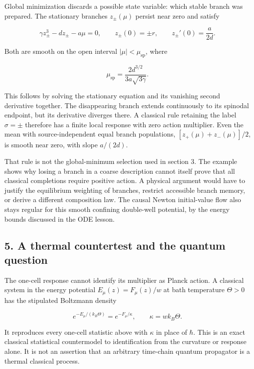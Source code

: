 \documentclass[11pt,a4paper]{article}
\begin{document}
Global minimization discards a possible state variable: which stable
branch was prepared. The stationary branches \(z_\pm(\mu)\) persist near
zero and satisfy

\[
 \gamma z_\pm^3-dz_\pm-a\mu=0,\qquad
 z_\pm(0)=\pm r,\qquad z_\pm'(0)=\frac a{2d}.
 \tag{13}
\]

Both are smooth on the open interval \(|\mu|<\mu_{\mathrm{sp}}\), where

\[\mu_{\mathrm{sp}}=
 \frac{2d^{3/2}}{3a\sqrt{3\gamma}}.\tag{14}\]

This follows by solving the stationary equation and its vanishing second
derivative together. The disappearing branch extends continuously to its
spinodal endpoint, but its derivative diverges there. A classical rule
retaining the label \(\sigma=\pm\) therefore has a finite local response
with zero action multiplier. Even the mean with source-independent equal
branch populations, \([z_+(\mu)+z_-(\mu)]/2\), is smooth near zero, with
slope \(a/(2d)\).

That rule is not the global-minimum selection used in section 3. The
example shows why losing a branch in a coarse description cannot itself
prove that all classical completions require positive action. A physical
argument would have to justify the equilibrium weighting of branches,
restrict accessible branch memory, or derive a different composition
law. The causal Newton initial-value flow also stays regular for this
smooth confining double-well potential, by the energy bounds discussed
in the ODE lesson.

\subsection{5. A thermal countertest and the quantum
question}\label{a-thermal-countertest-and-the-quantum-question}

The one-cell response cannot identify its multiplier as Planck action. A
classical system in the energy potential \(E_\mu(z)=F_\mu(z)/w\) at bath
temperature \(\Theta>0\) has the stipulated Boltzmann density

\[
 e^{-E_\mu/(k_B\Theta)}
       =e^{-F_\mu/\kappa},\qquad\kappa=wk_B\Theta.
 \tag{15}
\]

It reproduces every one-cell statistic above with \(\kappa\) in place of
\(\hbar\). This is an exact classical statistical countermodel to
identification from the curvature or response alone. It is not an
assertion that an arbitrary time-chain quantum propagator is a thermal
classical process.
\end{document}
